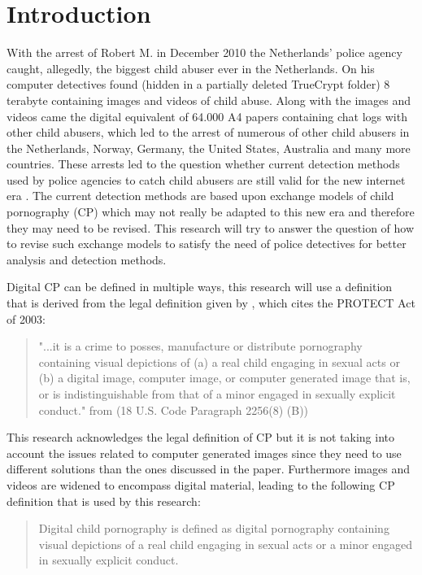 \documentclass{sig-alternate-br}
\begin{document}
\section{Introduction}
With the arrest of Robert M. in December 2010\cite{site:bbc} the Netherlands' police agency caught, allegedly, the biggest child abuser ever in the Netherlands. On his computer detectives found (hidden in a partially deleted TrueCrypt folder) 8 terabyte containing images and videos of child abuse. Along with the images and videos came the digital equivalent of 64.000 A4 papers containing chat logs with other child abusers, which led to the arrest of numerous of other child abusers in the Netherlands, Norway, Germany, the United States, Australia and many more countries. These arrests led to the question whether current detection methods used by police agencies to catch child abusers are still valid for the new internet era \cite{wijk2009achter}. The current detection methods are based upon exchange models of child pornography (CP) which may not really be adapted to this new era and therefore they may need to be revised. This research will try to answer the question of how to revise such exchange models to satisfy the need of police detectives for better analysis and detection methods. 

Digital CP can be defined in multiple ways, this research will use a definition that is derived from the legal definition given by \cite{beech2008internet}, which cites the PROTECT Act of 2003:
\begin{quote}
	"...it is a crime to posses, manufacture or distribute pornography containing visual depictions of (a) a real child engaging in sexual acts or (b) a digital image, computer image, or computer generated image that is, or is indistinguishable from that of a minor engaged in sexually explicit conduct." from (18 U.S. Code Paragraph 2256(8) (B))
\end{quote}
This research acknowledges the legal definition of CP but it is not taking into account the issues related to computer generated images since they need to use different solutions than the ones discussed in the paper. Furthermore images and videos are widened to encompass digital material, leading to the following CP definition that is used by this research:
\begin{quote} 
	Digital child pornography is defined as digital pornography containing visual depictions of a real child engaging in sexual acts or a minor engaged in sexually explicit conduct. 
\end{quote}
\end{document}
